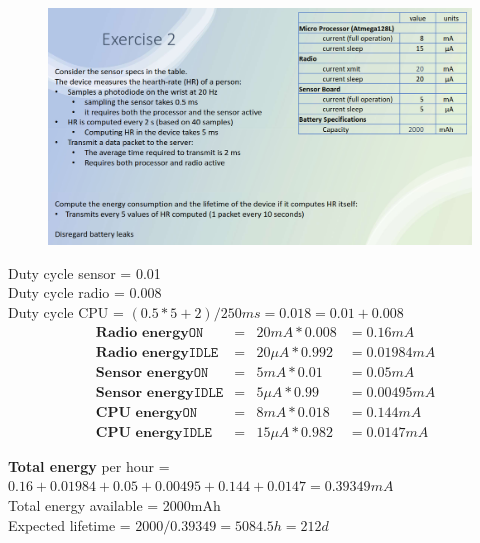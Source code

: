 

\begin{figure}[htbp]
   \centering
   \includegraphics{images/energy_exercise1.png}
   \label{fig:energy_exercise1}
\end{figure}

Duty cycle sensor = 0.01\\
Duty cycle radio = 0.008\\
Duty cycle CPU = $(0.5 * 5 + 2)/250ms = 0.018 = 0.01 + 0.008$
\nl
\begin{align*}
   &\textbf{Radio energy} \texttt{ON} &=& 20mA * 0.008 &= 0.16mA\\ 
   &\textbf{Radio energy} \texttt{IDLE} &=& 20\mu A *0.992 &= 0.01984mA\\
   &\textbf{Sensor energy} \texttt{ON} &=& 5mA *0.01 &= 0.05mA\\
   &\textbf{Sensor energy} \texttt{IDLE} &=& 5\mu A *0.99 &= 0.00495mA\\
   &\textbf{CPU energy} \texttt{ON} &=& 8mA * 0.018 &= 0.144mA\\
   &\textbf{CPU energy} \texttt{IDLE} &=& 15\mu A * 0.982 &= 0.0147mA
\end{align*}

\textbf{Total energy} per hour =\\
$0.16 + 0.01984 + 0.05 + 0.00495 + 0.144 + 0.0147 = 0.39349mA$\\
Total energy available = 2000mAh\\
Expected lifetime = $2000 / 0.39349 = 5084.5h = 212d$

